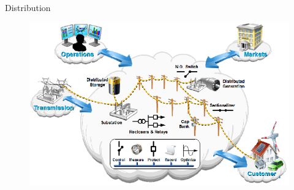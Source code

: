 \begin{frame}[fragile]{Distribution}
	\begin{figure}[h] 
		\includegraphics[scale=0.45]{imgs/distr.png}
	\end{figure}
\end{frame}
